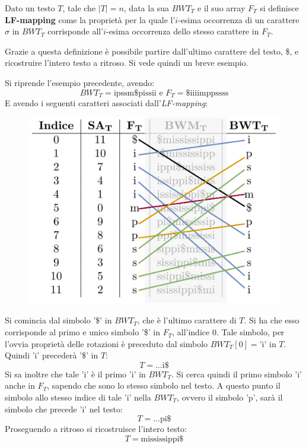 \begin{definizione}
  Dato un testo $T$, tale che $|T|=n$, data la sua $BWT_T$ e il suo array $F_T$
  si definisce \textbf{LF-mapping} come la proprietà per la quale l'$i$-esima
  occorrenza di un carattere $\sigma$ in $BWT_T$ corrisponde all'$i$-esima
  occorrenza dello stesso carattere in $F_T$.
\end{definizione}
Grazie a questa definizione è possibile partire dall'ultimo carattere del testo,
\$, e ricostruire l'intero testo a ritroso. Si vede quindi un breve esempio.
\begin{esempio}
  Si riprende l'esempio precedente, avendo:
  \[BWT_T=\mbox{ipssm\$pissii}\mbox{ e }F_T=\mbox{\$iiiimppssss}\]
  E avendo i seguenti caratteri associati dall'\textit{LF-mapping}:
  \begin{figure}[H]
    \centering
    \includegraphics[scale = 0.33]{img/lf.pdf}
  \end{figure}
  Si comincia dal simbolo '\$' in $BWT_T$, che è l'ultimo carattere di $T$. Si
  ha che esso corrisponde al primo e unico simbolo '\$' in $F_T$, all'indice
  $0$. Tale simbolo, per l'ovvia proprietà delle rotazioni è preceduto dal
  simbolo $BWT_T[0]=\mbox{'i'}$ in $T$. Quindi $\mbox{'i'}$ precederà '\$' in
  $T$:
  \[T=\ldots\mbox{i\$}\]
  Si sa inoltre che
  tale $\mbox{'i'}$ è il primo $\mbox{'i'}$ in $BWT_T$. Si cerca quindi il primo
  simbolo $\mbox{'i'}$ anche in $F_T$,
  sapendo che sono lo stesso simbolo nel testo. A questo punto il simbolo allo
  stesso indice di tale $\mbox{'i'}$ nella $BWT_T$, ovvero il simbolo
  $\mbox{'p'}$, sarà il simbolo che precede $\mbox{'i'}$ nel testo:
  \[T=\ldots\mbox{pi\$}\]
  Proseguendo a ritroso si ricostruisce l'intero testo:
  \[T=\mbox{mississippi\$}\]
\end{esempio}
